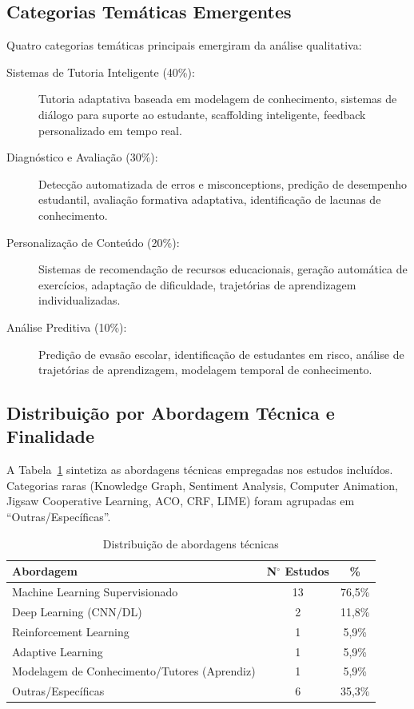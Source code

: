 \subsection{Categorias Temáticas Emergentes}

Quatro categorias temáticas principais emergiram da análise qualitativa:

\begin{description}
    \item[Sistemas de Tutoria Inteligente (40\%):] Tutoria adaptativa baseada em 
    modelagem de conhecimento, sistemas de diálogo para suporte ao estudante, 
    scaffolding inteligente, feedback personalizado em tempo real.
    
    \item[Diagnóstico e Avaliação (30\%):] Detecção automatizada de erros e 
    misconceptions, predição de desempenho estudantil, avaliação formativa adaptativa, 
    identificação de lacunas de conhecimento.
    
    \item[Personalização de Conteúdo (20\%):] Sistemas de recomendação de recursos 
    educacionais, geração automática de exercícios, adaptação de dificuldade, 
    trajetórias de aprendizagem individualizadas.
    
    \item[Análise Preditiva (10\%):] Predição de evasão escolar, identificação de 
    estudantes em risco, análise de trajetórias de aprendizagem, modelagem temporal 
    de conhecimento.
\end{description}

\subsection{Distribuição por Abordagem Técnica e Finalidade}

A Tabela~\ref{tab:abordagem-tecnica} sintetiza as abordagens técnicas empregadas 
nos estudos incluídos. Categorias raras (Knowledge Graph, Sentiment Analysis, Computer Animation, Jigsaw Cooperative Learning, ACO, CRF, LIME) foram agrupadas em ``Outras/Específicas''. 

\begin{table}[H]
\centering
\caption{Distribuição de abordagens técnicas}
\label{tab:abordagem-tecnica}
\begin{tabular}{lcc}
\hline
\textbf{Abordagem} & \textbf{N$^{\circ}$ Estudos} & \textbf{\%} \\
\hline
Machine Learning Supervisionado & 13 & 76,5\% \\
Deep Learning (CNN/DL) & 2 & 11,8\% \\
Reinforcement Learning & 1 & 5,9\% \\
Adaptive Learning & 1 & 5,9\% \\
Modelagem de Conhecimento/Tutores (Aprendiz) & 1 & 5,9\% \\
Outras/Específicas\footnotemark & 6 & 35,3\% \\
\hline
\end{tabular}
\end{table}

